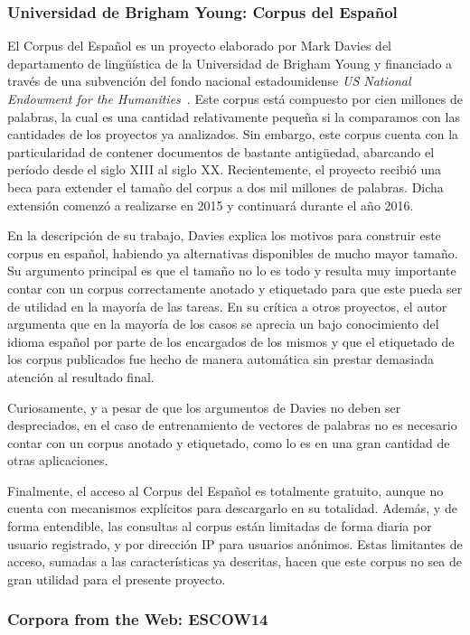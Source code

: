 \subsubsection{Universidad de Brigham Young: Corpus del Español}

El Corpus del Español es un proyecto elaborado por Mark Davies del departamento de lingüística de
la Universidad de Brigham Young y financiado a través de una subvención del fondo nacional
estadounidense \textit{US National Endowment for the Humanities}~\cite{CorpusDelEsp}. Este corpus está
compuesto por cien millones de palabras, la cual es una cantidad relativamente pequeña si la comparamos
con las cantidades de los proyectos ya analizados. Sin embargo,  este corpus cuenta con la particularidad
de contener documentos de bastante antigüedad, abarcando el período desde el siglo XIII al siglo XX.
Recientemente, el proyecto recibió una beca para extender el tamaño del corpus a dos mil millones de
palabras. Dicha extensión comenzó a realizarse en 2015 y continuará durante el año 2016.

En la descripción de su trabajo, Davies explica los motivos para construir este corpus en español,
habiendo ya alternativas disponibles de mucho mayor tamaño. Su argumento principal es que el tamaño
no lo es todo y resulta muy importante contar con un corpus correctamente anotado y etiquetado para
que este pueda ser de utilidad en la mayoría de las tareas. En su crítica a otros proyectos, el autor
argumenta que en la mayoría de los casos se aprecia un bajo conocimiento del idioma español por parte
de los encargados de los mismos y que el etiquetado de los corpus publicados fue hecho de manera
automática sin prestar demasiada atención al resultado final.

Curiosamente, y a pesar de que los argumentos de Davies no deben ser despreciados, en el caso de
entrenamiento de vectores de palabras no es necesario contar con un corpus anotado y etiquetado, como
lo es en una gran cantidad de otras aplicaciones.

Finalmente, el acceso al Corpus del Español es totalmente gratuito, aunque no cuenta con mecanismos
explícitos para descargarlo en su totalidad. Además, y de forma entendible, las consultas al corpus
están limitadas de forma diaria por usuario registrado, y por dirección IP para usuarios anónimos.
Estas limitantes de acceso, sumadas a las características ya descritas, hacen que este corpus no sea
de gran utilidad para el presente proyecto.

\subsubsection{Corpora from the Web: ESCOW14}

